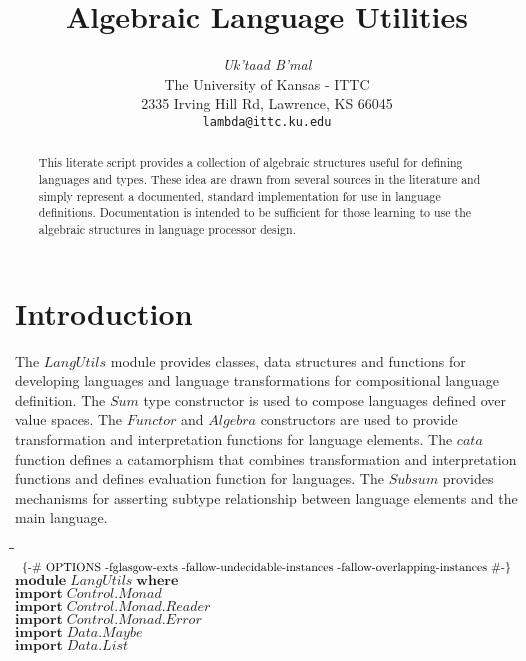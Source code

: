 \documentclass[11pt]{article}
\title{Algebraic Language Utilities}
\author{\emph{Uk'taad B'mal} \\
        The University of Kansas - ITTC \\
        2335 Irving Hill Rd, Lawrence, KS 66045 \\
        \texttt{lambda@ittc.ku.edu}}
\newlength{\lwidth}\setlength{\lwidth}{4.5cm}
\newlength{\cwidth}\setlength{\cwidth}{8mm} %
\newcommand{\Conid}[1]{\mathit{#1}}
\newcommand{\Varid}[1]{\mathit{#1}}
\begin{document}
\maketitle

\begin{abstract}
  This literate script provides a collection of algebraic structures
  useful for defining languages and types.  These idea are drawn from
  several sources in the literature and simply represent a documented,
  standard implementation for use in language definitions.
  Documentation is intended to be sufficient for those learning to use
  the algebraic structures in language processor design.
\end{abstract}

\section{Introduction}

The \ensuremath{\Conid{LangUtils}} module provides classes, data structures and functions
for developing languages and language transformations for
compositional language definition.  The \ensuremath{\Conid{Sum}} type constructor is used
to compose languages defined over value spaces.  The \ensuremath{\Conid{Functor}} and
\ensuremath{\Conid{Algebra}} constructors are used to provide transformation and
interpretation functions for language elements.  The \ensuremath{\Varid{cata}} function
defines a catamorphism that combines transformation and interpretation
functions and defines evaluation function for languages.  The \ensuremath{\Conid{Subsum}}
provides mechanisms for asserting subtype relationship between
language elements and the main language.

\begin{tabbing}
\qquad\=\hspace{\lwidth}\=\hspace{\cwidth}\=\+\kill
${\mbox{\enskip\{-\# OPTIONS -fglasgow-exts -fallow-undecidable-instances -fallow-overlapping-instances  \#-\}\enskip}}$\\
${\mathbf{module}\;\Conid{LangUtils}\;\mathbf{where}}$\\
${}$\\
${\mathbf{import}\;\Conid{\Conid{Control}.Monad}}$\\
${\mathbf{import}\;\Conid{\Conid{Control}.\Conid{Monad}.Reader}}$\\
${\mathbf{import}\;\Conid{\Conid{Control}.\Conid{Monad}.Error}}$\\
${\mathbf{import}\;\Conid{\Conid{Data}.Maybe}}$\\
${\mathbf{import}\;\Conid{\Conid{Data}.List}}$
\end{tabbing}
\end{document}
